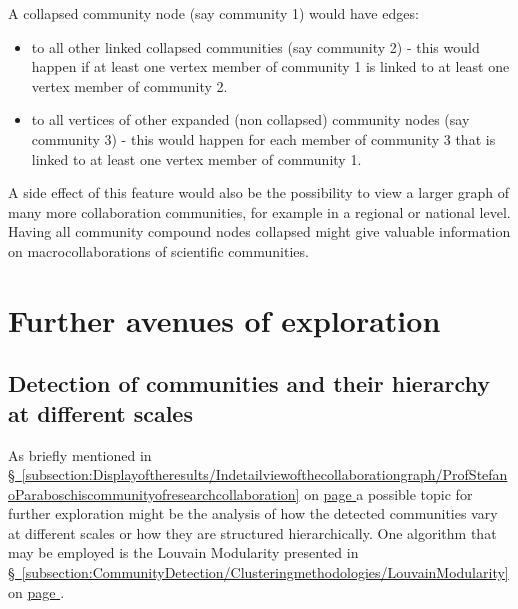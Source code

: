 A collapsed community node (say community 1) would have edges:
 \begin{itemize}[noitemsep]
	\item to all other linked collapsed communities (say community 2) - this would happen if at least one vertex member of community 1 is linked to at least one vertex member of community 2.
	\item to all vertices of other expanded (non collapsed) community nodes (say community 3) - this would happen for each member of community 3 that is linked to at least one vertex member of community 1.
\end{itemize}

A side effect of this feature would also be the possibility to view a larger graph of many more collaboration communities, for example in a regional or national level. Having all community compound nodes collapsed might give valuable information on macrocollaborations of scientific communities.

\section{Further avenues of exploration} \label{section:Conclusions/Furtheravenuesofexploration}

\subsection{Detection of communities and their hierarchy at different scales} \label{subsection:Conclusions/Furtheravenuesofexploration/Detectionofcommunitiesandtheirhierarchyatdifferentscales}
As briefly mentioned in \hyperref[subsection:Displayoftheresults/Indetailviewofthecollaborationgraph/ProfStefanoParaboschiscommunityofresearchcollaboration]{\S\ \ref{subsection:Displayoftheresults/Indetailviewofthecollaborationgraph/ProfStefanoParaboschiscommunityofresearchcollaboration}} on \hyperref[tobementionedinconclusions/Detectionofcommunitiesandtheirhierarchyatdifferentscales]{page \pageref{tobementionedinconclusions/Detectionofcommunitiesandtheirhierarchyatdifferentscales}}
a possible topic for further exploration might be the analysis of how the detected communities vary at different scales or how they are structured hierarchically.
One algorithm that may be employed is the Louvain Modularity presented in \hyperref[subsection:CommunityDetection/Clusteringmethodologies/LouvainModularity]{\S\ \ref{subsection:CommunityDetection/Clusteringmethodologies/LouvainModularity}} on \hyperref[tobementionedinconclusions/Detectionofcommunitiesandtheirhierarchyatdifferentscales]{page \pageref{subsection:CommunityDetection/Clusteringmethodologies/LouvainModularity}}.

